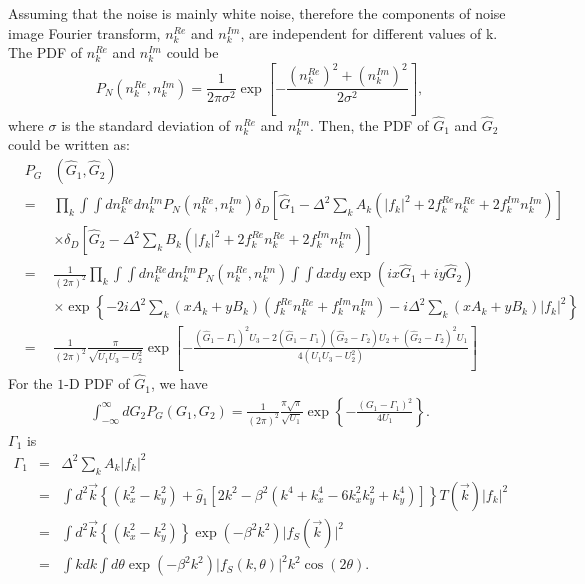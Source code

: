 \documentclass[twocolumn]{aastex62}
\begin{document}
\appendix
\label{app}
Assuming that the noise is mainly white noise, therefore the components of noise image Fourier transform, $n_k^{Re}$ and $n_k^{Im}$, are independent for different values of k. The PDF of $n_k^{Re}$ and $n_k^{Im}$ could be
\begin{equation}
P_N(n_k^{Re},n_k^{Im})=\frac{1}{2\pi\sigma^2}\exp\left[-\frac{\left(n_k^{Re}\right)^2+\left(n_k^{Im}\right)^2}{2\sigma^2}\right],
\end{equation}
where $\sigma$ is the standard deviation of $n_k^{Re}$ and $n_k^{Im}$.
Then, the PDF of $\hat{G}_1$ and $\hat{G}_2$ could be written as:
\begin{eqnarray}
&P_G&\left(\hat{G}_1,\hat{G}_2\right)\\ \nonumber
&=&\prod_k\int\int dn_k^{Re}dn_k^{Im}P_N(n_k^{Re},n_k^{Im})
\delta_D\left[\hat{G}_1-\Delta^2\sum_kA_k\left(\vert f_k\vert^2+2f_k^{Re}n_k^{Re}+2f_k^{Im}n_k^{Im}\right)\right]\\ \nonumber
&&\times\delta_D\left[\hat{G}_2-\Delta^2\sum_kB_k\left(\vert f_k\vert^2+2f_k^{Re}n_k^{Re}+2f_k^{Im}n_k^{Im}\right)\right]\\ \nonumber
&=&\frac{1}{(2\pi)^2}\prod_k\int\int dn_k^{Re}dn_k^{Im}P_N(n_k^{Re},n_k^{Im})
\int\int dxdy \exp\left(ix\hat{G}_1+iy\hat{G}_2\right)\\ \nonumber
&&\times\exp\left\{-2i\Delta^2\sum_k(xA_k+yB_k)\left(f_k^{Re}n_k^{Re}+f_k^{Im}n_k^{Im}\right)-i\Delta^2\sum_k(xA_k+yB_k)\vert f_k\vert^2\right\} \\ \nonumber
&=&\frac{1}{(2\pi)^2}\frac{\pi}{\sqrt{U_1U_3-U_2^2}}\exp\left[-\frac{\left(\hat{G}_1-\Gamma_1\right)^2U_3-2\left(\hat{G}_1-\Gamma_1\right)\left(\hat{G}_2-\Gamma_2\right)U_2+\left(\hat{G}_2-\Gamma_2\right)^2U_1}{4(U_1U_3-U_2^2)}\right]
\end{eqnarray}
For the $1$-D PDF of $\hat{G}_1$, we have
\begin{eqnarray}
\label{1d_PDF}
\int_{-\infty}^{\infty}dG_2 P_G\left(G_1,G_2\right)
=\frac{1}{(2\pi)^2}\frac{\pi\sqrt{\pi}}{\sqrt{U_1}}\exp\left\{-\frac{\left(G_1-\Gamma_1\right)^2}{4U_1}\right\}.
\end{eqnarray}
$\Gamma_1$ is
\begin{eqnarray}
\Gamma_1&=&\Delta^2\sum_kA_k\vert f_k\vert^2\\ \nonumber
&=&\int{d}^2\vec{k}\left\{\left(k_x^2-k_y^2\right)+\hat{g}_1\left[2k^2-\beta^2\left(k^4+k_x^4-6k_x^2k_y^2+k_y^4\right)\right]\right\}T(\vec{k})\vert f_k\vert^2\\ \nonumber
&=&\int{d}^2\vec{k}\left\{\left(k_x^2-k_y^2\right)\right\}\exp(-\beta^2k^2)\vert f_S(\vec{k})\vert^2 \\ \nonumber
&=&\int kdk\int d\theta \exp(-\beta^2k^2)\vert f_S(k,\theta)\vert^2k^2\cos(2\theta).\\ \nonumber
\end{eqnarray}
\end{document}
